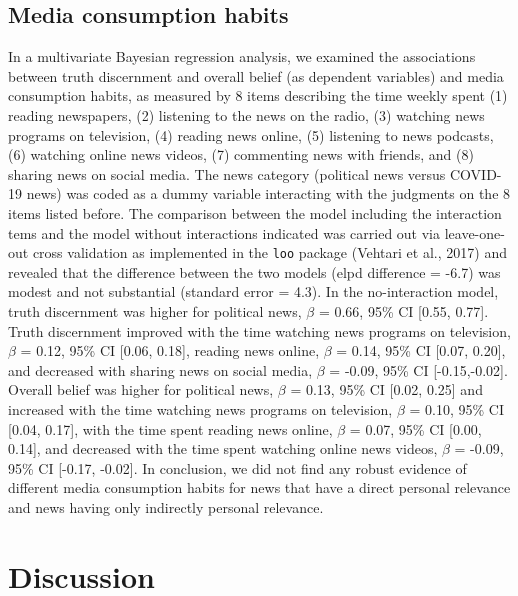\documentclass[
  english,
  man,floatsintext]{apa6}
\begin{document}
\hypertarget{media-consumption-habits}{%
\subsection{Media consumption habits}\label{media-consumption-habits}}

In a multivariate Bayesian regression analysis, we examined the associations between truth discernment and overall belief (as dependent variables) and media consumption habits, as measured by 8 items describing the time weekly spent (1) reading newspapers, (2) listening to the news on the radio, (3) watching news programs on television, (4) reading news online, (5) listening to news podcasts, (6) watching online news videos, (7) commenting news with friends, and (8) sharing news on social media. The news category (political news versus COVID-19 news) was coded as a dummy variable interacting with the judgments on the 8 items listed before. The comparison between the model including the interaction tems and the model without interactions indicated was carried out via leave-one-out cross validation as implemented in the \texttt{loo} package (Vehtari et al., 2017) and revealed that the difference between the two models (elpd difference = -6.7) was modest and not substantial (standard error = 4.3). In the no-interaction model, truth discernment was higher for political news, \(\beta\) = 0.66, 95\% CI {[}0.55, 0.77{]}. Truth discernment improved with the time watching news programs on television, \(\beta\) = 0.12, 95\% CI {[}0.06, 0.18{]}, reading news online, \(\beta\) = 0.14, 95\% CI {[}0.07, 0.20{]}, and decreased with sharing news on social media, \(\beta\) = -0.09, 95\% CI {[}-0.15,-0.02{]}. Overall belief was higher for political news, \(\beta\) = 0.13, 95\% CI {[}0.02, 0.25{]} and increased with the time watching news programs on television, \(\beta\) = 0.10, 95\% CI {[}0.04, 0.17{]}, with the time spent reading news online, \(\beta\) = 0.07, 95\% CI {[}0.00, 0.14{]}, and decreased with the time spent watching online news videos, \(\beta\) = -0.09, 95\% CI {[}-0.17, -0.02{]}. In conclusion, we did not find any robust evidence of different media consumption habits for news that have a direct personal relevance and news having only indirectly personal relevance.

\hypertarget{discussion}{%
\section{Discussion}\label{discussion}}
\end{document}
